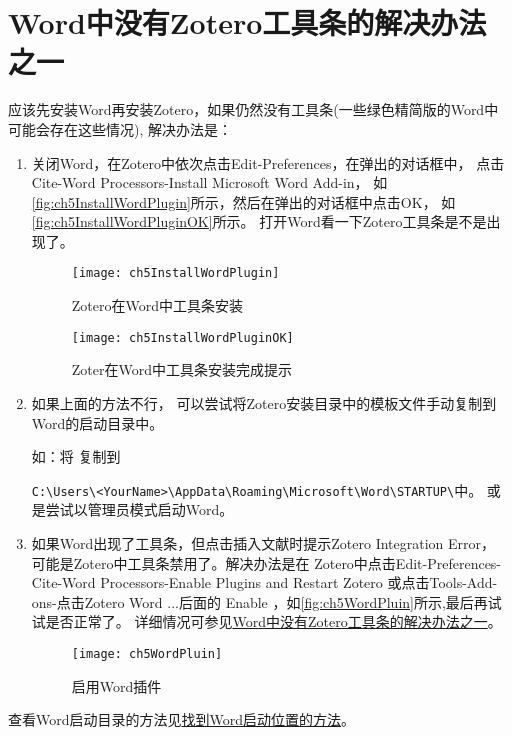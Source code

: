 \documentclass[cn,11pt,chinese]{elegantbook}
\begin{document}
    	\section{Word中没有Zotero工具条的解决办法之一}\label{sec:tool_bar}
	    	应该先安装Word再安装Zotero，如果仍然没有工具条(一些绿色精简版的Word中可能会存在这些情况),	    	
			解决办法是：
			\begin{enumerate}
				\item 关闭Word，在Zotero中依次点击Edit-Preferences，在弹出的对话框中，
				点击Cite-Word Processors-Install Microsoft Word Add-in，
				如\autoref{fig:ch5InstallWordPlugin}所示，然后在弹出的对话框中点击OK，
				如\autoref{fig:ch5InstallWordPluginOK}所示。
				打开Word看一下Zotero工具条是不是出现了。
			 
						\begin{figure}[htbp]
							\centering
							\texttt{[image: ch5InstallWordPlugin]}
							\caption{Zotero在Word中工具条安装}
							\label{fig:ch5InstallWordPlugin}
							\end{figure}
						
						\begin{figure}[htbp]
							\centering
							\texttt{[image: ch5InstallWordPluginOK]}
							\caption{Zoter在Word中工具条安装完成提示}
							\label{fig:ch5InstallWordPluginOK}
							\end{figure}
				\item 如果上面的方法不行，
			可以尝试将Zotero安装目录中的模板文件手动复制到Word的启动目录中。
	    	
			如：将
			复制到 

			\verb|C:\Users\<YourName>\AppData\Roaming\Microsoft\Word\STARTUP\|中。
			或是尝试以管理员模式启动Word。
	    		
			   \item 如果Word出现了工具条，但点击插入文献时提示Zotero Integration Error，
			   可能是Zotero中工具条禁用了。解决办法是在
			   Zotero中点击Edit-Preferences-Cite-Word Processors-Enable Plugins and Restart Zotero
			   或点击Tools-Add-ons-点击Zotero Word ...后面的 Enable
			   ，如\autoref{fig:ch5WordPluin}所示,最后再试试是否正常了。
			   详细情况可参见\href{https://zhuanlan.zhihu.com/p/58931999}
			   {Word中没有Zotero工具条的解决办法之一}。
		    		\begin{figure}[htbp]
		    				\centering
		    				\texttt{[image: ch5WordPluin]}
		    				\caption{启用Word插件}
		    				\label{fig:ch5WordPluin}
		    		\end{figure}	
			\end{enumerate}
				查看Word启动目录的方法见\href{https://zhuanlan.zhihu.com/p/85513418}
				{找到Word启动位置的方法}。
		
\end{document}
